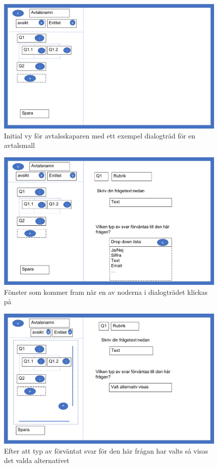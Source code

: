 \documentclass[a4paper,12pt]{article}
\begin{document}
\begin{figure}[H]
    \ContinuedFloat*
    \centering
    \includegraphics[width=0.8\linewidth]{img/avtalsskapare_1.png}
    \caption{Initial vy för avtalsskaparen med ett exempel dialogträd för en avtalsmall}
    \label{fig:design_frontend_1}
\end{figure}

\begin{figure}[H]
    \ContinuedFloat
    \centering
    \includegraphics[width=0.8\linewidth]{img/avtalsskapare_2.png}
    \caption{Fönster som kommer fram när en av noderna i dialogträdet klickas på}
\end{figure}

\begin{figure}[H]
    \ContinuedFloat
    \centering
    \includegraphics[width=0.8\linewidth]{img/avtalsskapare_3.png}
    \caption{Efter att typ av förväntat svar för den här frågan har valts så visas det valda alternativet}
\end{figure}
\end{document}
